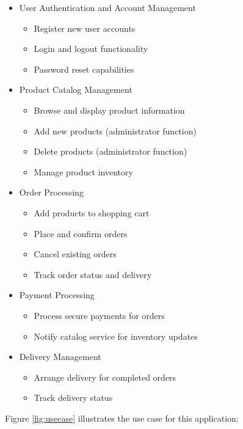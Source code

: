 \documentclass[oneside,a4paper,12pt,explicit]{book}
\begin{document}
\begin{itemize}
    \item User Authentication and Account Management
    \begin{itemize}
        \item Register new user accounts
        \item Login and logout functionality
        \item Password reset capabilities
    \end{itemize}
    
    \item Product Catalog Management
    \begin{itemize}
        \item Browse and display product information
        \item Add new products (administrator function)
        \item Delete products (administrator function)
        \item Manage product inventory
    \end{itemize}
    
    \item Order Processing
    \begin{itemize}
        \item Add products to shopping cart
        \item Place and confirm orders
        \item Cancel existing orders
        \item Track order status and delivery
    \end{itemize}
    
    \item Payment Processing
    \begin{itemize}
        \item Process secure payments for orders
        \item Notify catalog service for inventory updates
    \end{itemize}
    
    \item Delivery Management
    \begin{itemize}
        \item Arrange delivery for completed orders
        \item Track delivery status
    \end{itemize}
\end{itemize}
Figure \ref{fig:usecase} illustrates the use case for this application:
\end{document}
